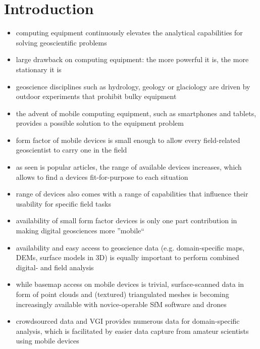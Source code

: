 \documentclass[review]{elsarticle}
\begin{document}
\linenumbers

\section{Introduction}
\label{sec:introduction}

\begin{itemize}
\item computing equipment continuously elevates the analytical capabilities for solving geoscientific problems
\item large drawback on computing equipment: the more powerful it is, the more stationary it is
\item geoscience disciplines such as hydrology, geology or glaciology are driven by outdoor experiments that prohibit bulky equipment
\item the advent of mobile computing equipment, such as smartphones and tablets, provides a possible solution to the equipment problem
\item form factor of mobile devices is small enough to allow every field-related geoscientist to carry one in the field
\item as seen is popular articles, the range of available devices increases, which allows to find a devices fit-for-purpose to each situation
\item range of devices also comes with a range of capabilities that influence their usability for specific field tasks
\end{itemize}

\begin{itemize}
\item availability of small form factor devices is only one part contribution in making digital geosciences more ''mobile``
\item availability and easy access to geoscience data (e.g. domain-specific maps, \glspl{DEM}, surface models in 3D) is equally important to perform combined digital- and field analysis
\item while basemap access on mobile devices is trivial, surface-scanned data in form of point clouds and (textured) triangulated meshes is becoming increasingly available with novice-operable \gls{SfM} software and drones
\item crowdsourced data and \gls{VGI} provides numerous data for domain-specific analysis, which is facilitated by easier data capture from amateur scientists using mobile devices
\end{itemize}
\end{document}
